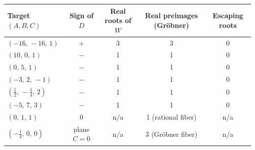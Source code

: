\begin{tabular}{lcccc}
\toprule
Target $(A,B,C)$ & Sign of $D$ & Real roots of $W$ & Real preimages (Gr\"obner) & Escaping roots \\
\midrule
$(-16,\,-16,\,1)$ & $+$ & 3 & 3 & 0 \\
$(10,\,0,\,1)$ & $-$ & 1 & 1 & 0 \\
$(0,\,5,\,1)$ & $-$ & 1 & 1 & 0 \\
$(-3,\,2,\,-1)$ & $-$ & 1 & 1 & 0 \\
$(\tfrac{1}{2},\,-\tfrac{1}{3},\,2)$ & $-$ & 1 & 1 & 0 \\
$(-5,\,7,\,3)$ & $-$ & 1 & 1 & 0 \\
\midrule
$(0,\,1,\,1)$ & $0$ & n/a & 1 (rational fiber) & n/a \\
$(-\tfrac14,\,0,\,0)$ & plane $C=0$ & n/a & 3 (Gr\"obner fiber) & n/a \\
\bottomrule
\end{tabular}

